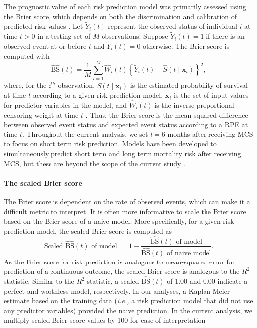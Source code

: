 \documentclass{article}
\begin{document}
The prognostic value of each risk prediction model was primarily
assessed using the Brier score, which depends on both the discrimination
and calibration of predicted risk values
\cite{graf1999assessment, rufibach2010use}. Let \(\tilde{Y}_i(t)\)
represent the observed status of individual \(i\) at time \(t > 0\) in a
testing set of \(M\) observations. Suppose \(\tilde{Y}_i(t)=1\) if there
is an observed event at or before \(t\) and \(\tilde{Y}_i(t)=0\)
otherwise. The Brier score is computed with
\begin{equation} \label{eqn:brier_score}
\widehat{\textrm{BS}}(t)= \frac{1}{M} \sum_{i=1}^{M} \widehat{W}_i(t) \left\{ \tilde{Y}_i(t) - \widehat{S}(t \mid \bm{x}_i) \right\}^2, \end{equation}
where, for the \(i^{th}\) observation, \(\widehat{S}(t \mid \bm{x}_i)\)
is the estimated probability of survival at time \(t\) according to a
given risk prediction model, \(\bm{x}_i\) is the set of input values for
predictor variables in the model, and \(\widehat{W}_i(t)\) is the
inverse proportional censoring weight at time \(t\)
\cite{gerds2006consistent}. Thus, the Brier score is the mean squared
difference between observed event status and expected event status
according to a RPE at time \(t\). Throughout the current analysis, we
set \(t = 6\) months after receiving MCS to focus on short term risk
prediction. Models have been developed to simultaneously predict short
term and long term mortality risk after receiving MCS, but these are
beyond the scope of the current study
\cite{blackstone1986decomposition}.

\paragraph{The scaled Brier score}

The Brier score is dependent on the rate of observed events, which can
make it a difficult metric to interpret. It is often more informative to
scale the Brier score based on the Brier score of a naive model. More
specifically, for a given risk prediction model, the scaled Brier score
is computed as
\[\textrm{Scaled } \widehat{\textrm{BS}}(t)\textrm{ of model } = 1 - \frac{\widehat{\textrm{BS}}(t)\textrm{ of model}}{\widehat{\textrm{BS}}(t)\textrm{ of naive model}}.\]
As the Brier score for risk prediction is analogous to mean-squared
error for prediction of a continuous outcome, the scaled Brier score is
analogous to the \(R^2\) statistic. Similar to the \(R^2\) statistic, a
scaled \(\widehat{\textrm{BS}}(t)\) of 1.00 and 0.00 indicate a perfect
and worthless model, respectively. In our analyses, a Kaplan-Meier
estimate based on the training data (\textit{i.e., }a risk prediction
model that did not use any predictor variables) provided the naive
prediction. In the current analysis, we multiply scaled Brier score
values by 100 for ease of interpretation.
\end{document}
